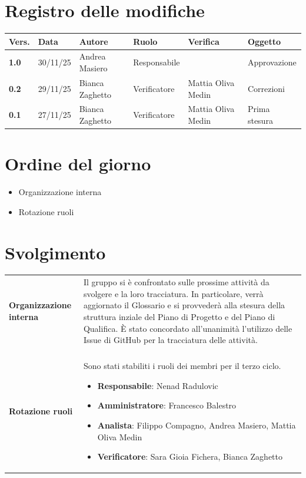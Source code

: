 \documentclass[a4paper,12pt]{article}
\begin{document}


\newpage
\section*{Registro delle modifiche}

\begin{table}[h!]
\begin{tabularx}{\textwidth}{|l|l|l|l|L|L|}
\hline
\textbf{Vers.} & \textbf{Data} & \textbf{Autore} & \textbf{Ruolo} & \textbf{Verifica} & \textbf{Oggetto} \\
\hline
\textbf{1.0} & 30/11/25 & Andrea Masiero & Responsabile &  & Approvazione \\
\hline
\textbf{0.2} & 29/11/25 & Bianca Zaghetto & Verificatore & Mattia Oliva Medin & Correzioni \\
\hline
\textbf{0.1} & 27/11/25 & Bianca Zaghetto & Verificatore & Mattia Oliva Medin & Prima stesura \\
\hline
\end{tabularx}
\end{table}

\newpage
\tableofcontents
\newpage

\section{Ordine del giorno}
\begin{itemize}
    \item Organizzazione interna
    \item Rotazione ruoli
\end{itemize}

\section{Svolgimento}
\begin{longtable}{P{5cm}|P{10cm}} 
\textbf{Organizzazione interna} & Il gruppo si è confrontato sulle prossime attività da svolgere e la loro tracciatura. In particolare, verrà aggiornato il Glossario e si provvederà alla stesura della struttura inziale del Piano di Progetto e del Piano di Qualifica. È stato concordato all'unanimità l'utilizzo delle Issue di GitHub per la tracciatura delle attività.\\
\\
\textbf{Rotazione ruoli} & Sono stati stabiliti i ruoli dei membri per il terzo
ciclo.
\begin{itemize}
    \item \textbf{Responsabile}: Nenad Radulovic
    \item \textbf{Amministratore}: Francesco Balestro
    \item \textbf{Analista}: Filippo Compagno, Andrea Masiero, Mattia Oliva Medin
    \item \textbf{Verificatore}: Sara Gioia Fichera, Bianca Zaghetto
\end{itemize}\\
\end{longtable}
\end{document}
